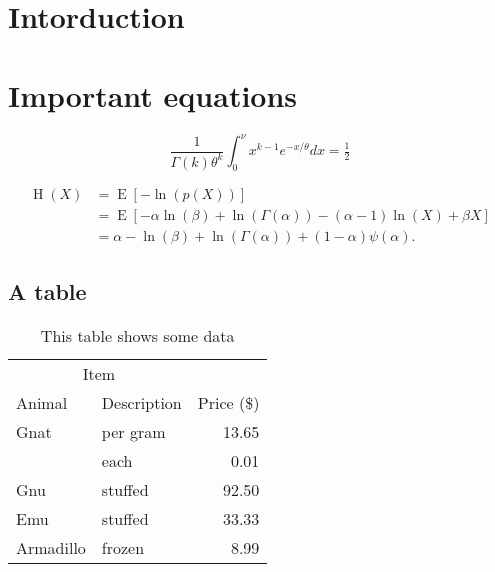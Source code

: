 \documentclass[12pt, a4paper, twoside]{article}%
\title{\mytitle}
\author{Tommy O.}
\numberwithin{equation}{section}
\begin{document}
\maketitle
\pagestyle{fancy}
\begin{abstract}
\noindent \blindtext
\end{abstract}
\tableofcontents


\section{Intorduction}
\blindtext

\section{Important equations}
\blindtext

\begin{equation}
	\frac{1}{\Gamma(k) \theta^k} \int_0^\nu x^{k - 1} e^{-x/\theta} dx = \tfrac{1}{2}
\end{equation}

\blindtext

\begin{align}
\operatorname{H}(X) & = \operatorname{E}[-\ln(p(X))] \\
& = \operatorname{E}[-\alpha \ln(\beta) + \ln(\Gamma(\alpha)) - (\alpha-1)\ln(X) + \beta X] \\
& = \alpha - \ln(\beta) + \ln(\Gamma(\alpha)) + (1-\alpha)\psi(\alpha).
\end{align}

\subsection{A table}
\blindtext

\begin{table}[ht!]
	\centering
	\caption{This table shows some data}
	\begin{tabular}{llr}  
		\toprule
		\multicolumn{2}{c}{Item} \\
		\cmidrule(r){1-2}
		Animal    & Description & Price (\$) \\
		\midrule
		Gnat      & per gram    & 13.65      \\
		&    each     & 0.01       \\
		Gnu       & stuffed     & 92.50      \\
		Emu       & stuffed     & 33.33      \\
		Armadillo & frozen      & 8.99       \\
		\bottomrule
	\end{tabular}
	
	\label{tab:myfirsttable}
\end{table}
\blindtext
\end{document}
